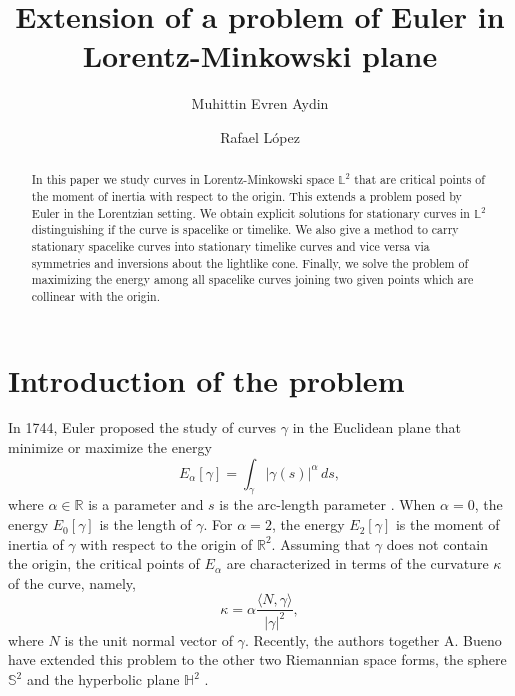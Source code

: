 \documentclass[a4paper,12pt]{amsart}
\theoremstyle{definition}
\def\r{\mathbb R}
\def\l{\mathbb L}
\begin{document}
\title{Extension of a problem of Euler in    Lorentz-Minkowski plane}
 
\author{Muhittin Evren Aydin}
\address{Department of Mathematics, Faculty of Science, Firat University, Elazig,  23200 Turkey}
\author{Rafael L\'opez}
\address{Departamento de Geometr\'{\i}a y Topolog\'{\i}a Universidad de Granada 18071 Granada, Spain}
\begin{abstract}
In this paper we study curves  in Lorentz-Minkowski space $\l^{2}$ that are critical points of the moment of inertia with respect to the origin. This extends a problem posed by Euler in the Lorentzian setting.  We obtain explicit solutions for stationary curves in $\l^2$ distinguishing if the curve is spacelike or timelike. We also give a method to carry stationary spacelike curves into stationary timelike curves and vice versa via symmetries and inversions about the lightlike cone. Finally, we solve the problem of maximizing the energy among all spacelike curves joining two given points which are collinear with the origin.
\end{abstract}

 

\maketitle
\section{Introduction of the problem}

In 1744, Euler proposed the study of curves $\gamma$ in the Euclidean plane that minimize or maximize the energy
\begin{equation}\label{Eu1}
E_{\alpha}[\gamma]=\int_\gamma |\gamma(s)|^\alpha\, ds,
\end{equation}
where $\alpha\in\r$ is a parameter and $s$ is the arc-length parameter \cite{eu}.  When $\alpha=0$, the energy $E_0[\gamma]$ is the  length of $\gamma$. For  $\alpha=2$, the energy $E_2[\gamma]$ is the moment of inertia of $\gamma$ with respect to the origin of $\r^2$. Assuming that $\gamma$ does not contain the origin, the critical points of $E_\alpha$ are  characterized in terms of the curvature $\kappa$ of the curve, namely,  
\begin{equation}\label{Eu2}
\kappa =\alpha\frac{\langle N ,\gamma \rangle}{|\gamma|^2},
\end{equation}
where  $N$ is the unit normal vector of $\gamma$.     Recently, the authors together A. Bueno have extended this problem to the other two Riemannian space forms, the sphere $\mathbb{S}^2$ and the hyperbolic plane $\mathbb{H}^2$ \cite{abl}.
 
\end{document}
